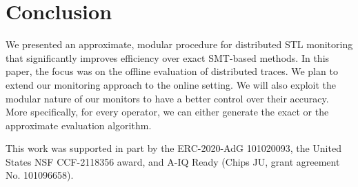 \section{Conclusion} \label{sec:conclusion}



We presented an approximate, modular procedure for distributed STL monitoring that significantly improves efficiency over exact SMT-based methods.
In this paper, the focus was on the offline evaluation of distributed traces.
We plan to extend our monitoring approach to the online setting.
We will also exploit the modular nature of our monitors to have a better control over their accuracy.
More specifically, for every operator, we can either generate the exact or the approximate evaluation algorithm.


This work was supported in part by the ERC-2020-AdG 101020093, the United States NSF CCF-2118356 award, and A-IQ Ready (Chips JU, grant agreement No. 101096658).